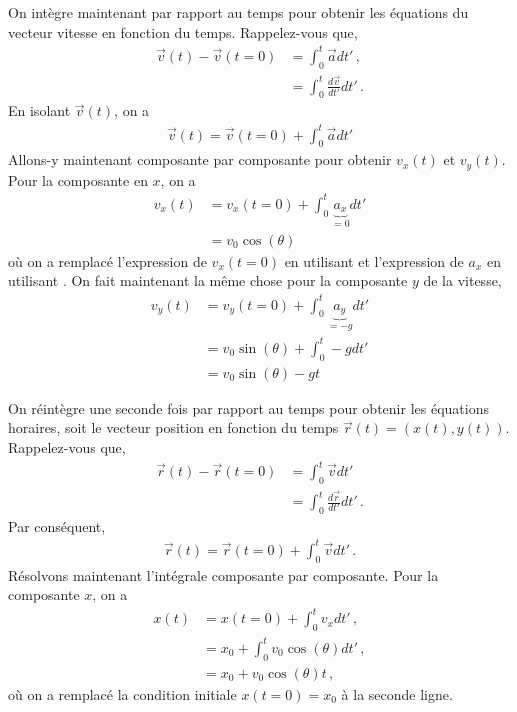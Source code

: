 \documentclass[titlepage]{article}
\theoremstyle{cleanremark}
\begin{document}
On intègre maintenant par rapport au temps pour obtenir les équations du vecteur vitesse en fonction du temps. Rappelez-vous que, 
\begin{align}
    \vec{v}(t) -\vec{v}(t=0)&= \int_{0}^{t} \vec{a} dt'\, ,
    \\
    &= \int_{0}^{t} \frac{d\vec{v}}{dt'} dt'\, .
\end{align}
En isolant $\vec{v}(t)$, on a 
\begin{align}
    \vec{v}(t) = \vec{v}(t=0) + \int_{0}^{t} \vec{a} dt'
\end{align}
Allons-y maintenant composante par composante pour obtenir $v_x(t)$ et $v_y(t)$. Pour la composante en $x$, on a
\begin{align}
    v_x(t) &= v_x(t=0) + \int_{0}^{t} \underbrace{a_x}_{=0} dt'
    \\
    &= v_0\cos(\theta) 
\end{align}
où on a remplacé l'expression de $v_x(t=0)$ en utilisant  et l'expression de $a_x$ en utilisant . 
On fait maintenant la même chose pour la composante $y$ de la vitesse, 
\begin{align}
    v_y(t) &= v_y(t=0) + \int_0^{t} \underbrace{a_y}_{=-g}dt'
    \\
    &= v_0\sin(\theta) + \int_0^{t}-g dt'
    \\
    &= v_0\sin(\theta) -g t
\end{align}

On réintègre une seconde fois par rapport au temps pour obtenir les équations horaires, soit le vecteur position en fonction du temps $\vec{r}(t)=(x(t), y(t))$. 
Rappelez-vous que, 
\begin{align}
    \vec{r}(t) - \vec{r}(t=0) &= \int_0^{t} \vec{v}dt' \\
    &= \int_0^{t} \frac{d \vec{r}}{dt'} dt'\, .
\end{align}
Par conséquent, 
\begin{align}
    \vec{r}(t) = \vec{r}(t=0) + \int_{0}^{t} \vec{v} dt' \, .
\end{align}
Résolvons maintenant l'intégrale composante par composante. Pour la composante $x$, on a
\begin{align}
    x(t) &= x(t=0) + \int_0^{t} v_x dt'\, ,
    \\
    &= x_0 + \int_{0}^{t} v_0\cos(\theta) dt'\, ,
    \\
    &= x_0 + v_0\cos(\theta) t\, ,
\end{align}
où on a remplacé la condition initiale $x(t=0)=x_0$ à la seconde ligne.
\end{document}
